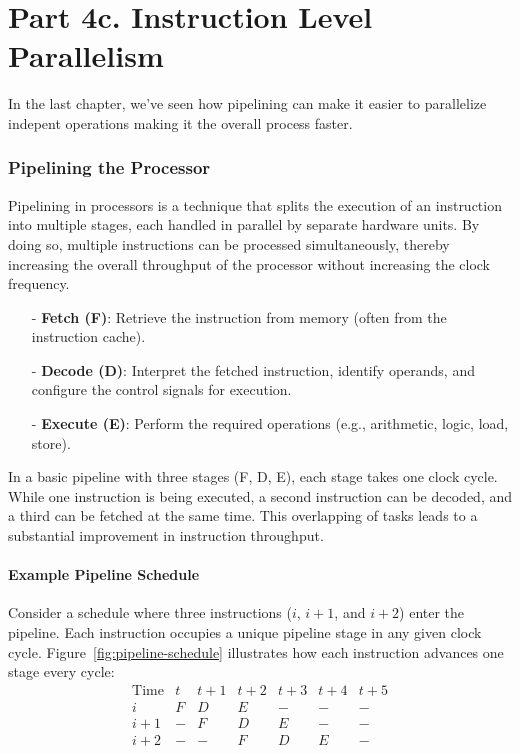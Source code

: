 \chapter{Part 4c. Instruction Level Parallelism}
In the last chapter, we've seen how pipelining can make it easier to parallelize indepent operations making it the overall process faster.

\subsection{Pipelining the Processor}
Pipelining in processors is a technique that splits the execution of an instruction into multiple stages, each handled in parallel by separate hardware units. By doing so, multiple instructions can be processed simultaneously, thereby increasing the overall throughput of the processor without increasing the clock frequency.

\begin{itemize}
    \item[-] \textbf{Fetch (F)}: Retrieve the instruction from memory (often from the instruction cache).
    \item[-] \textbf{Decode (D)}: Interpret the fetched instruction, identify operands, and configure the control signals for execution.
    \item[-] \textbf{Execute (E)}: Perform the required operations (e.g., arithmetic, logic, load, store).
\end{itemize}

\noindent In a basic pipeline with three stages (F, D, E), each stage takes one clock cycle. While one instruction is being executed, a second instruction can be decoded, and a third can be fetched at the same time. This overlapping of tasks leads to a substantial improvement in instruction throughput.

\subsubsection*{Example Pipeline Schedule}
Consider a schedule where three instructions (\(i\), \(i+1\), and \(i+2\)) enter the pipeline. Each instruction occupies a unique pipeline stage in any given clock cycle. Figure~\ref{fig:pipeline-schedule} illustrates how each instruction advances one stage every cycle:
\[
\begin{array}{c|cccccc}
\text{Time} & t & t+1 & t+2 & t+3 & t+4 & t+5 \\ \hline
i     & F & D & E & - & - & - \\
i+1   & - & F & D & E & - & - \\
i+2   & - & - & F & D & E & - \\
\end{array}
\]

